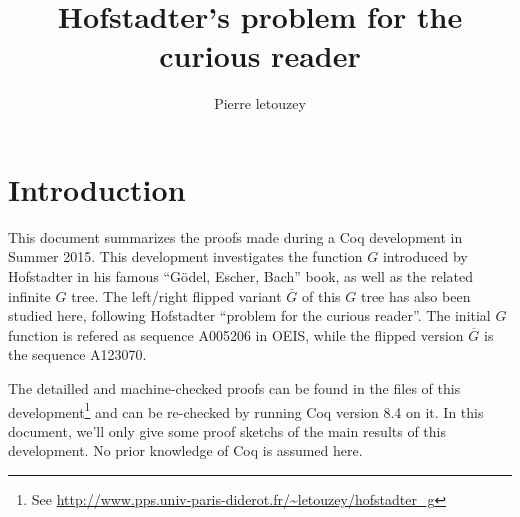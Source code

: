 \documentclass[a4paper,11pt]{article}
\title{Hofstadter's problem for the curious reader}
\author{Pierre letouzey}
\begin{document}
\newtheorem{theorem}{Theorem}
\newtheorem{definition}{Definition}
\maketitle

\newcommand{\FG}{\ensuremath{\overline{G}}}
\newcommand{\fibrest}{\ensuremath{\Sigma F_i}}

\section{Introduction}
This document summarizes the proofs made during a Coq development in
Summer 2015. This development investigates the function $G$ introduced
by Hofstadter in his famous ``Gödel, Escher, Bach'' book\cite{??}, as
well as the related infinite $G$ tree. The left/right flipped variant
$\FG$ of this $G$ tree has also been studied here, following
Hofstadter ``problem for the curious reader''.
The initial $G$ function is refered as sequence A005206 in
OEIS\cite{??}, while the flipped version $\FG$ is the sequence
A123070.

The detailled and machine-checked proofs can be found in the files
of this development\footnote{See
\url{http://www.pps.univ-paris-diderot.fr/~letouzey/hofstadter_g}}
and can be re-checked by running Coq version 8.4 \cite{??} on it.
In this document, we'll only give some proof sketchs of the
main results of this development. No prior knowledge of Coq is assumed
here.
\end{document}

